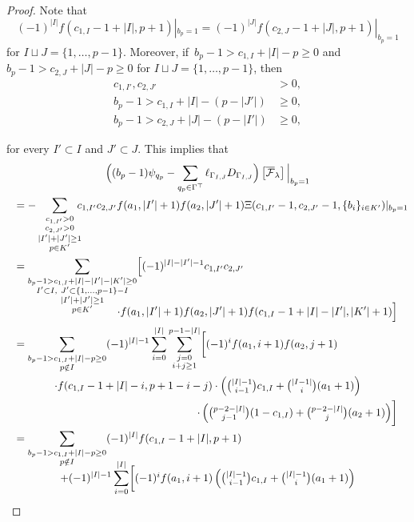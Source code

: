 \documentclass[JEP,XML,SOM,Unicode,NoFloatCountersInSection,published]{cedram}
\let\ts\textstyle
\theoremstyle{definition}
\begin{document}
\begin{proof}
Note that
\[
(-1)^{|I|}f(c_{1,I}-1+|I|,p+1)|_{b_p=1}=(-1)^{|J|}f(c_{2,J}-1+|J|,p+1)|_{b_p=1}
\]
for $I\sqcup J=\{1,\ldots,p-1\}$.
Moreover, if~$b_p-1>c_{1,I}+|I|-p\geq 0$ and $b_p-1>c_{2,J}+|J|-p\geq 0$ for $I\sqcup J=\{1,\ldots,p-1\}$, then
\begin{align*}
c_{1,I'}, c_{2,J'} & >  0,\\
b_p-1>c_{1,I}+|I|-(p-|J'|) & \geq  0,\\
b_p-1>c_{2,J}+|J|-(p-|I'|) & \geq  0,
\end{align*}
\noindent
\begin{minipage}{\textwidth}
for every $I'\subset I$ and $J'\subset J$. This implies that
\begin{multline*}
\Bigl( (b_p-1)\psi_{q_p}- \sum_{q_p\in \Gamma^{\top}}\ell_{\Gamma_{I,J}}D_{\Gamma_{I,J}}\Bigr)\left[\overline{\mathcal{F}}_{\lambda}\right]\Big|_{b_p=1}\\
\shoveleft{= -\sum_{\substack{c_{1,I'}>0 \\ c_{2,J'}>0 \\ |I'|+|J'|\geq 1 \\ p\in K'}}\hspace*{-2mm}
c_{1,I'}c_{2,J'}f(a_1,|I'|+1)f(a_2,|J'|+1)\Xi(c_{1,I'}-1,c_{2,J'}-1,\{b_i\}_{i\in K'})|_{b_p=1}}\\
\shoveleft{=\sum_{\substack{b_p-1>c_{1,I}+|I|-|I'|-|K'|\geq 0\\ I'\subset I , \ J' \subset \{1,\ldots,p-1\}-I \\ |I'|+|J'|\geq 1 \\ p\in K'}}\Bigl[(-1)^{|I|-|I'|-1}c_{1,I'}c_{2,J'}}\\[-15pt]
 \shoveright{\cdot f(a_1,|I'|+1)f(a_2,|J'|+1)f(c_{1,I}-1+|I|-|I'|,|K'|+1)\Bigr]}\\
\shoveleft{=\sum_{\substack{b_p-1>c_{1,I}+|I|-p\geq 0\\ p \notin I}}(-1)^{|I|-1}\sum_{i=0}^{|I|}\sum_{\substack{j=0\\i+j\geq 1}}^{p-1-|I|}\biggl[(-1)^i f(a_1,i+1)f(a_2,j+1)}\\
 \cdot f(c_{1,I}-1+|I|-i,p+1-i-j)
 \ts\cdot \left( \binom{|I|-1}{i-1}c_{1,I}+\binom{|I-1|}{i}(a_1+1)\right)\\
\shoveright{\ts\cdot\left( \binom{p-2-|I|}{j-1}(1-c_{1,I})+\binom{p-2-|I|}{j}(a_2+1) \right)\biggr]}\\
\shoveleft{=\sum_{\substack{b_p-1>c_{1,I}+|I|-p\geq 0\\ p\notin I}}(-1)^{|I|}f(c_{1,I}-1+|I|,p+1)}\\[-10pt]
+(-1)^{|I|-1} \sum_{i=0}^{|I|}\biggl[\ts(-1)^i f(a_1,i+1)\left( \binom{|I|-1}{i-1}c_{1,I}+\binom{|I|-1}{i}(a_1+1) \right)\\

\end{multline*}
\end{minipage}
\end{proof}
\end{document}
